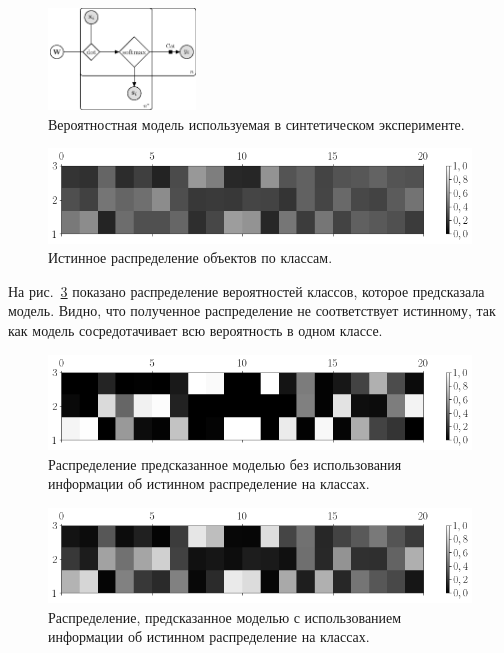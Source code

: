 \documentclass[12pt]{a&t}
\begin{document}
\begin{figure}[h!t]\center
\includegraphics[width=0.35\textwidth]{figures/linear_model}
\caption{Вероятностная модель используемая в синтетическом эксперименте.}
\label{fg:ex:synt:plate}
\end{figure}

\begin{figure}[h!t]\center
\includegraphics[width=1\textwidth]{figures/syn_real_distr}
\caption{Истинное распределение  объектов по классам.}
\label{fg:ex:synt:distr:real}
\end{figure}


На рис.~\ref{fg:ex:synt:distr:without} показано распределение вероятностей классов, которое предсказала модель. Видно, что полученное распределение не соответствует истинному, так как модель сосредотачивает всю вероятность в одном классе.

\begin{figure}[h!t]\center
\includegraphics[width=1\textwidth]{figures/syn_without_teacher_distr}
\caption{Распределение предсказанное моделью без использования информации об истинном распределение на классах.}
\label{fg:ex:synt:distr:without}
\end{figure}

\begin{figure}[h!t]\center
\includegraphics[width=1\textwidth]{figures/syn_with_teacher_distr}
\caption{Распределение, предсказанное моделью с использованием информации об истинном распределение на классах.}
\label{fg:ex:synt:distr:with}
\end{figure}
\end{document}

